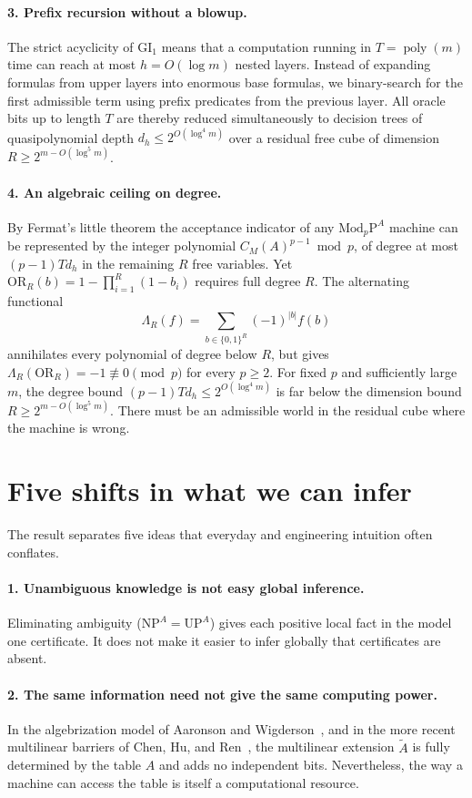 \documentclass[11pt,a4paper]{article}
\newcommand{\NP}{\mathrm{NP}}
\newcommand{\UP}{\mathrm{UP}}
\newcommand{\MP}[1]{\mathrm{Mod}_{#1}\mathrm P}
\newcommand{\GI}{\mathrm{GI}_1}
\newcommand{\OR}{\mathrm{OR}}
\begin{document}
\paragraph{3. Prefix recursion without a blowup.}
The strict acyclicity of \(\GI\) means that a computation running in \(T=\operatorname{poly}(m)\) time can reach at most \(h=O(\log m)\) nested layers. Instead of expanding formulas from upper layers into enormous base formulas, we binary-search for the first admissible term using prefix predicates from the previous layer. All oracle bits up to length \(T\) are thereby reduced simultaneously to decision trees of quasipolynomial depth \(d_h\le 2^{O(\log^4 m)}\) over a residual free cube of dimension \(R\ge 2^{m-O(\log^5 m)}\).

\paragraph{4. An algebraic ceiling on degree.}
By Fermat's little theorem the acceptance indicator of any \(\MP p^A\) machine can be represented by the integer polynomial \(C_M(A)^{p-1}\bmod p\), of degree at most \((p-1)Td_h\) in the remaining \(R\) free variables. Yet \(\OR_R(b)=1-\prod_{i=1}^R(1-b_i)\) requires full degree \(R\). The alternating functional
\[
 \Lambda_R(f)=\sum_{b\in\{0,1\}^R}(-1)^{|b|}f(b)
\]
annihilates every polynomial of degree below \(R\), but gives \(\Lambda_R(\OR_R)=-1\not\equiv0\pmod p\) for every \(p\ge 2\). For fixed \(p\) and sufficiently large \(m\), the degree bound \((p-1)Td_h\le 2^{O(\log^4 m)}\) is far below the dimension bound \(R\ge 2^{m-O(\log^5 m)}\). There must be an admissible world in the residual cube where the machine is wrong.

\section{Five shifts in what we can infer}
The result separates five ideas that everyday and engineering intuition often conflates.

\paragraph{1. Unambiguous knowledge is not easy global inference.}
Eliminating ambiguity (\(\NP^A=\UP^A\)) gives each positive local fact in the model one certificate. It does not make it easier to infer globally that certificates are absent.

\paragraph{2. The same information need not give the same computing power.}
In the algebrization model of Aaronson and Wigderson~\cite{aw}, and in the more recent multilinear barriers of Chen, Hu, and Ren~\cite{chr}, the multilinear extension \(\widetilde A\) is fully determined by the table \(A\) and adds no independent bits. Nevertheless, the way a machine can access the table is itself a computational resource.
\end{document}
